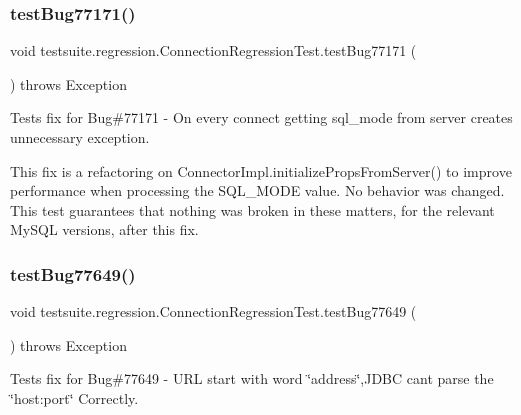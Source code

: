 \subsubsection{\texorpdfstring{test\+Bug77171()}{testBug77171()}}
{\footnotesize\ttfamily void testsuite.\+regression.\+Connection\+Regression\+Test.\+test\+Bug77171 (\begin{DoxyParamCaption}{ }\end{DoxyParamCaption}) throws Exception}

Tests fix for Bug\#77171 -\/ On every connect getting sql\+\_\+mode from server creates unnecessary exception.

This fix is a refactoring on Connector\+Impl.\+initialize\+Props\+From\+Server() to improve performance when processing the S\+Q\+L\+\_\+\+M\+O\+DE value. No behavior was changed. This test guarantees that nothing was broken in these matters, for the relevant My\+S\+QL versions, after this fix. \mbox{\label{classtestsuite_1_1regression_1_1_connection_regression_test_ad3b1937f8602e34bfceaeaf3229c9e68}} 
\subsubsection{\texorpdfstring{test\+Bug77649()}{testBug77649()}}
{\footnotesize\ttfamily void testsuite.\+regression.\+Connection\+Regression\+Test.\+test\+Bug77649 (\begin{DoxyParamCaption}{ }\end{DoxyParamCaption}) throws Exception}

Tests fix for Bug\#77649 -\/ U\+RL start with word \char`\"{}address\char`\"{},J\+D\+BC can\textquotesingle{}t parse the \char`\"{}host\+:port\char`\"{} Correctly. \mbox{\label{classtestsuite_1_1regression_1_1_connection_regression_test_a678832d70128500168a8e75e47930a55}} 
